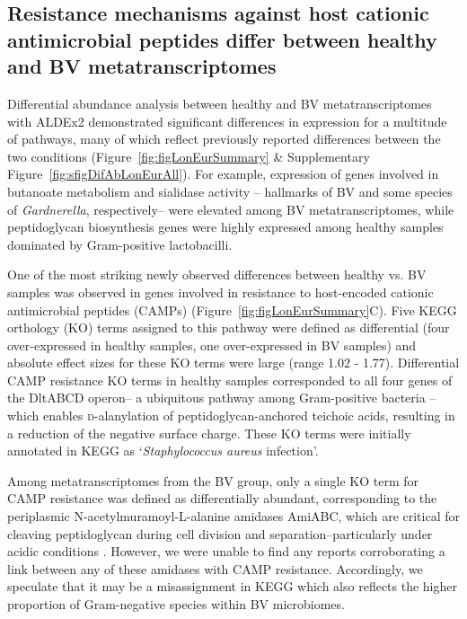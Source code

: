 \documentclass[sn-mathphys,Numbered]{sn-jnl}%
\begin{document}
\subsection{Resistance mechanisms against host cationic antimicrobial peptides differ between healthy and BV metatranscriptomes} \label{subsec:subsecCAMPs}

Differential abundance analysis between healthy and BV metatranscriptomes with ALDEx2 demonstrated significant differences in expression for a multitude of pathways, many of which reflect previously reported differences between the two conditions (Figure~\ref{fig:figLonEurSummary} \& Supplementary Figure~\ref{fig:sfigDifAbLonEurAll}). For example, expression of genes involved in butanoate metabolism \citep{yeoman_multi-omic_2013} and sialidase activity \citep{hardy_presence_2017-1}-- hallmarks of BV and some species of \textit{Gardnerella}, respectively-- were elevated among BV metatranscriptomes, while peptidoglycan biosynthesis genes were highly expressed among healthy samples dominated by Gram-positive lactobacilli.

One of the most striking newly observed differences between healthy vs. BV samples was observed in genes involved in resistance to host-encoded cationic antimicrobial peptides (CAMPs) (Figure~\ref{fig:figLonEurSummary}C). Five KEGG orthology (KO) terms assigned to this pathway were defined as differential (four over-expressed in healthy samples, one over-expressed in BV samples) and absolute effect sizes for these KO terms were large (range 1.02 - 1.77). Differential CAMP resistance KO terms in healthy samples corresponded to all four genes of the DltABCD operon-- a ubiquitous pathway among Gram-positive bacteria \citep{neuhaus_continuum_2003}-- which enables \textsc{d}-alanylation of peptidoglycan-anchored teichoic acids, resulting in a reduction of the negative surface charge. These KO terms were initially annotated in KEGG as `\textit{Staphylococcus aureus} infection'.

Among metatranscriptomes from the BV group, only a single KO term for CAMP resistance was defined as differentially abundant, corresponding to the periplasmic N-acetylmuramoyl-L-alanine amidases AmiABC, which are critical for cleaving peptidoglycan during cell division and separation--particularly under acidic conditions \citep{mueller_active_2021}. However, we were unable to find any reports corroborating a link between any of these amidases with CAMP resistance. Accordingly, we speculate that it may be a misassignment in KEGG which also reflects the higher proportion of Gram-negative species within BV microbiomes.
\end{document}
